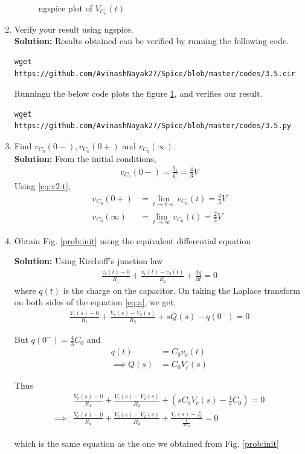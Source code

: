 \documentclass[journal,12pt,twocolumn]{IEEEtran}
\newcommand{\solution}{\noindent \textbf{Solution: }}
\providecommand{\brak}[1]{\ensuremath{\left(#1\right)}}
\providecommand{\der}[1]{\mathrm{d} #1}
\numberwithin{equation}{section}
\renewcommand\thesection{\arabic{section}}
\begin{document}
\begin{enumerate}[label=\arabic*.,ref=\thesection.\theenumi]
\begin{figure}[!ht]
	\caption{ngspice plot of $V_{C_0}(t)$} 
	\label{fig:ngspice2}
\end{figure}
	\item Verify your result using ngspice.\\
	\solution Results obtained can be verified by running the following code.
	\begin{lstlisting}
wget https://github.com/AvinashNayak27/Spice/blob/master/codes/3.5.cir
	\end{lstlisting}
Runningn the below code plots the figure \ref{fig:ngspice2}, and verifies our result.
	\begin{lstlisting}
wget https://github.com/AvinashNayak27/Spice/blob/master/codes/3.5.py
	\end{lstlisting}



	\item Find $v_{C_0}(0-), v_{C_0}(0+)$ and  $v_{C_0}(\infty) $.\\
\solution From the initial conditions,
\begin{align}
    v_{C_0}(0-) = \frac{q_1}{C} = {\frac{4}{3}}{V}
\end{align}
Using \eqref{eq:v2-t},
\begin{align}
    v_{C_0}(0+) &= \lim_{t \to 0+}v_{C_0}(t) = {\frac{4}{3}}{V} \\
    v_{C_0}(\infty) &= \lim_{t \to \infty}v_{C_0}(t) = {\frac{2}{3}}{V}
\end{align}

\item Obtain Fig. \ref{prob:init} using the equivalent differential equation

\solution Using Kirchoff's junction law
\begin{align}
	\label{eq:a}
	\frac{v_c(t) - 0}{R_1} + \frac{v_c(t) - v_2(t)}{R_2} + \frac{\der{q}}{\der{t}} = 0
\end{align}
where $q(t)$ is the charge on the capacitor.
On taking the Laplace transform on both sides of the equation \eqref{eq:a}, we get,
\begin{align}
	\frac{V_c(s) - 0}{R_1} + \frac{V_c(s) - V_2(s)}{R_2} +sQ(s) - q(0^-) = 0
\end{align}

But $q(0^-) = \frac43 C_0$ and 
\begin{align}
	q(t) &= C_0v_c(t) \\
	\implies Q(s) &= C_0V_c(s)
\end{align}

Thus
\begin{align}
	&\frac{V_c(s) - 0}{R_1} + \frac{V_c(s) - V_2(s)}{R_2} + \brak{sC_0V_c(s) - \frac43 C_0} = 0 \\
	\implies &\frac{V_c(s) - 0}{R_1} + 	\frac{V_c(s) - V_2(s)}{R_2} + \frac{V_c(s) - \frac{4}{3s}}{\frac{1}{sC_0}} = 0 
\end{align}

which is the same equation as the one we obtained from Fig. \ref{prob:init}
\end{enumerate}
\end{document}
